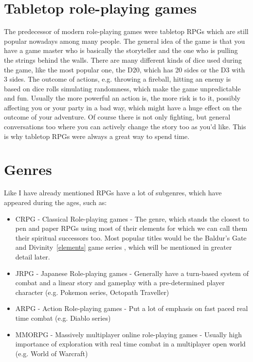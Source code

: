 \documentclass[10pt,twoside,english,a4paper]{article}
\begin{document}
\section{Tabletop role-playing games} \label{tabletop}

The predecessor of modern role-playing games were tabletop RPGs which are still popular nowadays among many people. The general idea of the game is that you have a game master who is basically the storyteller and the one who is pulling the strings behind the walls. There are many different kinds of dice used during the game, like the most popular one, the D20, which has 20 sides or the D3 with 3 sides.  The outcome of actions, e.g. throwing a fireball, hitting an enemy is based on dice rolls simulating randomness, which make the game unpredictable and fun. Usually the more powerful an action is, the more risk is to it, possibly affecting you or your party in a bad way, which might have a huge effect on the outcome of your adventure. Of course there is not only fighting, but general conversations too where you can actively change the story too as you'd like. This is why tabletop RPGs were always a great way to spend time.

\section{Genres} \label{genres}

Like I have already mentioned RPGs have a lot of subgenres, which have appeared during the ages, such as:
\begin{itemize}
  \item CRPG - Classical Role-playing games - The genre, which stands the closest to pen and paper RPGs using most of their elements for which we can call them their spiritual successors too. Most popular titles would be the Baldur's Gate and Divinity~\ref{elements} game series , which will be mentioned in greater detail later. 
  \item JRPG - Japanese Role-playing games - Generally have a turn-based system of combat and a linear story and gameplay with a pre-determined player character (e.g. Pokemon series, Octopath Traveller)
  \item ARPG - Action Role-playing games - Put a lot of emphasis on fast paced real time combat (e.g. Diablo series)
  \item MMORPG - Massively multiplayer online role-playing games - Usually high importance of exploration with real time combat in a multiplayer open world (e.g. World of Warcraft)
\end{itemize} 
\end{document}
